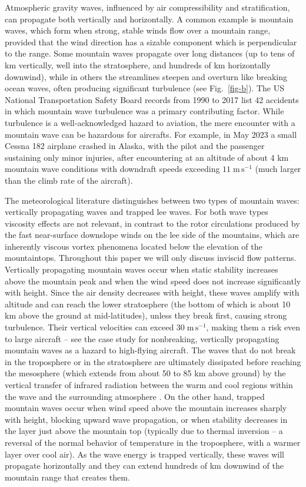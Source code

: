 \documentclass[11pt,twoside,reqno,centertags]{amsart}
\theoremstyle{definition}
\begin{document}
Atmospheric gravity waves, influenced by air compressibility and stratification, can propagate both vertically and horizontally. A common example is mountain waves, which form when strong, stable winds flow over a mountain range, 
provided that the wind direction has a sizable component which is perpendicular to the range. Some mountain waves propagate over long distances (up to tens of km vertically, well into the stratosphere, and hundreds of km horizontally downwind), 
while in others the streamlines steepen and overturn like breaking ocean waves, often producing significant turbulence (see Fig.~\ref{fig-b}). The US 
National Transportation Safety Board records from 1990 to 2017 list 42 accidents in which mountain wave turbulence was a primary contributing factor. 
While turbulence is a well-acknowledged hazard to aviation, the mere encounter with a mountain wave can be hazardous for aircrafts. For example, in May 2023 a small Cessna 182 airplane crashed in Alaska, 
with the pilot and the passenger sustaining only minor injuries, after encountering 
at an altitude of about 4 km mountain wave conditions with downdraft speeds exceeding $11\;\mathrm{m\,s^{-1}}$ (much larger than the climb rate of the aircraft). 

The meteorological literature distinguishes between two types of mountain waves: vertically propagating waves and trapped lee waves. For both wave types viscosity effects are not relevant, in contrast to the rotor circulations 
produced by the fast near-surface downslope winds on the lee side of the mountains, which are inherently viscous vortex phenomena located below the elevation of the mountaintops. Throughout this paper we will only discuss inviscid flow patterns. 
Vertically propagating mountain waves occur when static stability increases above the mountain peak and when the wind speed does not increase significantly with height. 
Since the air density decreases with height, these waves amplify with altitude and can reach the lower stratosphere (the bottom of which is about 10 km above the ground at mid-latitudes), unless they break first, causing strong turbulence. 
Their vertical velocities can exceed $30\;\mathrm{m\,s^{-1}}$, making them a risk even to large aircraft -- see the case study \cite{bdw} for nonbreaking, vertically propagating mountain waves as a hazard to high-flying aircraft. The waves that do not break in the troposphere or in the stratosphere 
are ultimately dissipated before reaching the mesosphere (which extends from about 50 to 85 km above ground) 
by the vertical transfer of infrared radiation between the warm and cool regions within the wave and the surrounding atmosphere \cite{Dur}. On the other hand, trapped mountain waves occur when wind speed 
above the mountain increases sharply with height, blocking upward wave propagation, or when stability decreases in the layer just above the mountain top (typically due to 
thermal inversion -- a reversal of the normal behavior of temperature in the troposphere, with a warmer layer over cool air). As the wave energy is trapped vertically, these waves will propagate horizontally 
and they can extend hundreds of km downwind of the mountain range that creates them.
\end{document}
